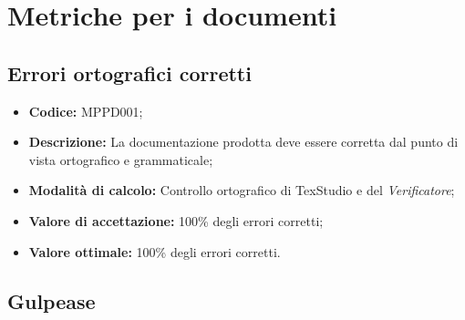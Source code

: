\documentclass[openany,12pt,a4paper]{report}
\begin{document}

\section{Metriche per i documenti}

\subsection{Errori ortografici corretti}

\begin{itemize}
    \item \textbf{Codice:} MPPD001;
    \item \textbf{Descrizione:} La documentazione prodotta deve essere corretta dal punto di vista ortografico e grammaticale;
    \item \textbf{Modalità di calcolo:} Controllo ortografico di TexStudio e del \textit{Verificatore};
    \item \textbf{Valore di accettazione:} 100\% degli errori corretti;
    \item \textbf{Valore ottimale:} 100\% degli errori corretti.
\end{itemize}

\subsection{Gulpease}
\end{document}
